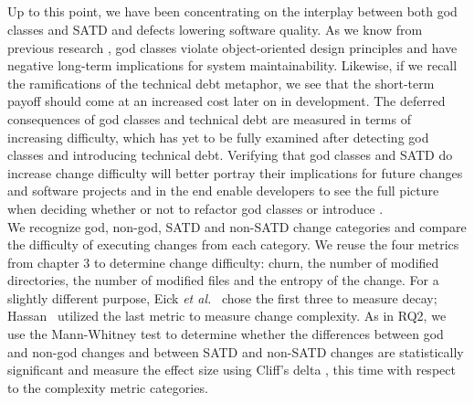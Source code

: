 {\subsection*{\chapterIVrqIII}

Up to this point, we have been concentrating on the interplay between both god classes and SATD and defects lowering software quality. As we know from previous research \cite{marinescu2004detection}, god classes violate object-oriented design principles and have negative long-term implications for system maintainability. Likewise, if we recall the ramifications of the technical debt metaphor, we see that the short-term payoff should come at an increased cost later on in development. The deferred consequences of god classes and technical debt are measured in terms of increasing difficulty, which has yet to be fully examined after detecting god classes and introducing technical debt. Verifying that god classes and SATD do increase change difficulty will better portray their implications for future changes and software projects and in the end enable developers to see the full picture when deciding whether or not to refactor god classes or introduce \SATD. \\

We recognize god, non-god, SATD and non-SATD change categories and compare the difficulty of executing changes from each category. We reuse the four metrics from chapter 3 to determine change difficulty: churn, the number of modified directories, the number of modified files and the entropy of the change. For a slightly different purpose, Eick \emph{et al.}~\cite{eick2001decay} chose the first three to measure decay; Hassan~\cite{hassan2009predicting} utilized the last metric to measure change complexity. As in RQ2, we use the Mann-Whitney test \cite{mann1947test} to determine whether the differences between god and non-god changes and between SATD and non-SATD changes are statistically significant and measure the effect size using Cliff's delta \cite{Cliff:2005}, this time with respect to the complexity metric categories. 





}
